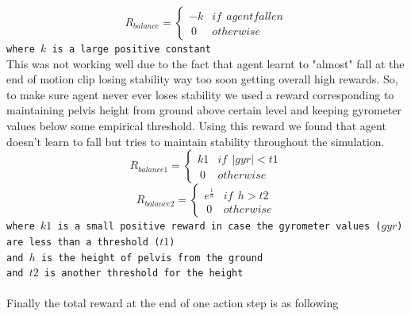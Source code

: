 $$R_{balance} =
    \begin{cases*}
      -k & if \ \ agent fallen \\ 
       \ 0  & otherwise
    \end{cases*}
$$
\texttt{where $k$ is a large positive constant}
\vspace{1em}
\\
This was not working well due to the fact that agent learnt to "almost" fall at the end of motion clip losing stability way too soon getting overall high rewards. So, to make sure agent never ever loses stability we used  a reward corresponding to maintaining pelvis height from ground above certain level and keeping gyrometer values below some empirical threshold. Using this reward we found that agent doesn't learn to fall but tries to maintain stability throughout the simulation.
$$R_{balance1} =
    \begin{cases*}
        k1 & if \ \ |gyr| < t1 \\ 
       \ 0  & otherwise
    \end{cases*}
$$
$$R_{balance2} =
    \begin{cases*}
        e^{\frac{1}{h}} & if \ \ h > t2 \\ 
       \ 0  & otherwise
    \end{cases*}
$$
\texttt{where $k1$ is a small positive reward in case the gyrometer values ($gyr$) are less than a threshold ($t1$)\\
and  $h$ is the height of pelvis from the ground \\
and $t2$ is another threshold for the height}
\\\\
Finally the total reward at the end of one action step is as following

